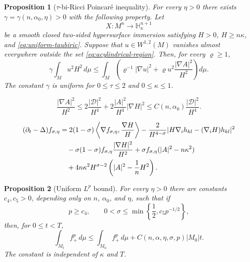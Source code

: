 \documentclass[10pt,a4paper]{amsart}
\newtheorem{proposition}{Proposition}
\newcommand{\Hh}{\mathbb H}
\begin{document}
\begin{proposition}[$\tau$-bi-Ricci Poincar\'e inequality]
\label{prop:tau-poincare}
For every $\eta>0$ there exists
$\gamma=\gamma(n,\alpha_0,\eta)>0$ with the following property.
Let
\begin{equation*}
 X:M^n\longrightarrow\Hh^{n+1}_{\kappa}
\end{equation*}
be a smooth closed two-sided hypersurface immersion satisfying
$H>0$, $H\geq n\kappa$, and \eqref{eq:uniform-taubiric}.  Suppose that
$u\in W^{1,2}(M)$ vanishes almost everywhere outside the set
\eqref{eq:acylindrical-region}.  Then, for every $\varrho\geq1$,
\begin{equation}\label{eq:tau-poincare}
 \gamma\int_Mu^2H^2\,d\mu
 \leq
 \int_M\left(
 \varrho^{-1}|\nabla u|^2
 +\varrho u^2\frac{|\nabla A|^2}{H^2}
 \right)d\mu.
\end{equation}
The constant $\gamma$ is uniform for
$0\leq\tau\leq2$ and $0\leq\kappa\leq1$.
\end{proposition}

\begin{equation}\label{eq:D-controls-gradient}
 \frac{|\nabla A|^2}{H^2}
 \leq 2\frac{|\mathcal D|^2}{H^4}
 +2\frac{|A|^2}{H^4}|\nabla H|^2
 \leq C(n,\alpha_0)\frac{|\mathcal D|^2}{H^4}.
\end{equation}

\begin{align}
 (\partial_t-\Delta)f_{\sigma,\eta}
 &=2(1-\sigma)\left\langle
       \nabla f_{\sigma,\eta},\frac{\nabla H}{H}\right\rangle
 -\frac{2}{H^{4-\sigma}}
  |H\nabla_i h_{kl}-(\nabla_iH)h_{kl}|^2 \notag\\
 &\quad-\sigma(1-\sigma)f_{\sigma,\eta}
          \frac{|\nabla H|^2}{H^2}
 +\sigma f_{\sigma,\eta}(|A|^2-n\kappa^2)\notag\\
 &\quad+4n\kappa^2H^{\sigma-2}
       \left(|A|^2-\frac1nH^2\right).
 \label{eq:f-evol}
\end{align}

\begin{proposition}[Uniform $L^p$ bound]\label{prop:lp-bound}
For every $\eta>0$ there are constants $c_4,c_5>0$, depending only on $n$,
$\alpha_0$, and $\eta$, such that if
\begin{equation*}
 p\geq c_4,
 \qquad
 0<\sigma\leq\min\left\{\frac12,c_5p^{-1/2}\right\},
\end{equation*}
then, for $0\leq t<T$,
\begin{equation}\label{eq:lp-bound}
 \int_{M_t}f_+^p\,d\mu
 \leq\int_{M_0}f_+^p\,d\mu
 +C(n,\alpha,\eta,\sigma,p)|M_0|t.
\end{equation}
The constant is independent of $\kappa$ and $T$.
\end{proposition}
\end{document}
